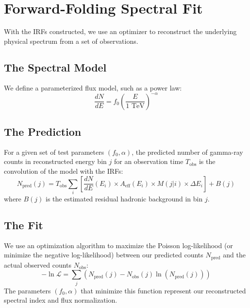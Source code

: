 \documentclass[12pt]{article}
\begin{document}
\section{Forward-Folding Spectral Fit}
With the IRFs constructed, we use an optimizer to reconstruct the underlying physical spectrum from a set of observations.

\subsection{The Spectral Model}
We define a parameterized flux model, such as a power law:
\begin{equation}
\frac{dN}{dE} = f_0 \left(\frac{E}{1 \text{ TeV}}\right)^{-\alpha}
\end{equation}

\subsection{The Prediction}
For a given set of test parameters $(f_0, \alpha)$, the predicted number of gamma-ray counts in reconstructed energy bin $j$ for an observation time $T_{\text{obs}}$ is the convolution of the model with the IRFs:
\begin{equation}
N_{\text{pred}}(j) = T_{\text{obs}} \sum_{i} \left[ \frac{dN}{dE}(E_i) \times A_{\text{eff}}(E_i) \times M(j | i) \times \Delta E_i \right] + B(j)
\end{equation}
where $B(j)$ is the estimated residual hadronic background in bin $j$.

\subsection{The Fit}
We use an optimization algorithm to maximize the Poisson log-likelihood (or minimize the negative log-likelihood) between our predicted counts $N_{\text{pred}}$ and the actual observed counts $N_{\text{obs}}$:
\begin{equation}
-\ln \mathcal{L} = \sum_{j} \left( N_{\text{pred}}(j) - N_{\text{obs}}(j) \ln(N_{\text{pred}}(j)) \right)
\end{equation}
The parameters $(f_0, \alpha)$ that minimize this function represent our reconstructed spectral index and flux normalization.
\end{document}
